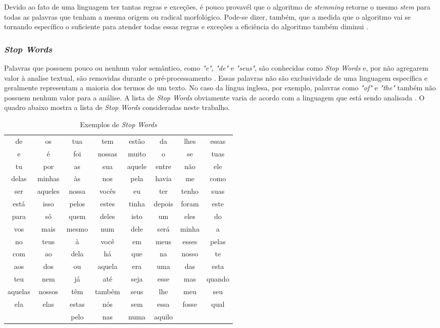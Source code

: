 Devido ao fato de uma linguagem ter tantas regras e exceções, é pouco provavél que o algoritmo de \textit{stemming} retorne o mesmo \textit{stem} para todas as palavras que tenham a mesma origem ou radical morfológico. Pode-se dizer, também, que a medida que o algoritmo vai se tornando específico o suficiente para atender todas essas regras e exceções a eficiência do algoritmo também diminui \cite{imamura2001}.

\subsubsection{\textit{Stop Words}}
\label{ssub:stop_words}

Palavras que possuem pouco ou nenhum valor semântico, como \textit{"e"}, \textit{"de"} e \textit{"seus"}, são conhecidas como \textit{Stop Words} e, por não agregarem valor à analise textual, são removidas durante o pré-processamento \cite{rajaraman2011}. Essas palavras não são exclusividade de uma linguagem específica e geralmente representam a maioria dos termos de um texto. No caso da língua inglesa, por exemplo, palavras como \textit{"of"} e \textit{"the"} também não possuem nenhum valor para a análise. A lista de \textit{Stop Words} obviamente varia de acordo com a linguagem que está sendo analisada \cite{lopes2015}. O quadro abaixo mostra a lista de \textit{Stop Words} consideradas neste trabalho.

\begin{table}[h]
\centering
\begin{tabular}{cccccccc}
\cline{1-8}
de & os & tua & tem & estão & da & lhes & essas \\
e & é & foi & nossas & muito & o & se & tuas \\
tu & por & as & sua & aquele & entre & não & ele \\
delas & minhas & às & nos & pela & havia & me & como \\
ser & aqueles & nossa & vocês & eu & ter & tenho & suas \\
está & isso & pelos & estes & tinha & depois & foram & este \\
para & só & quem & deles & isto & um & eles & do \\
vos & mais & mesmo & num & dele & será & minha & a \\
no & teus & à & você & em & meus & esses & pelas \\
com & ao & dela & há & que & na & nosso & te \\
aos & dos & ou & aquela & era & uma & das & esta \\
teu & nem & já & até & seja & esse & mas & quando \\
aquelas & nossos & têm & também & seus & lhe & meu & seu \\
ela & elas & estas & nós & sem & essa & fosse & qual \\
& & pelo & nas & numa & aquilo & & \\
\cline{1-8}
\end{tabular}
\caption{Exemplos de \textit{Stop Words}}
\label{exemplos-stop-words}
\end{table}
